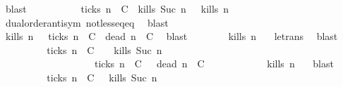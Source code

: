 \begin{isabellebody}
\ blast\isanewline
\ \ \ \ \ \ \isamarkupfalse%
\ \isamarkupfalse%
\ {\isacartoucheopen}{\isacharparenleft}{\isacharparenleft}{\isasymnot}\ {\isacharquery}ticks\ n\ {\isasymrho}\ C\ {\isasymand}\ {\isacharparenleft}{\isacharquery}kills\ {\isacharparenleft}Suc\ n{\isacharparenright}\ {\isasymrho}{\isacharparenright}{\isacharparenright}\ {\isasymlongrightarrow}\ {\isacharquery}kills\ n\ {\isasymrho}{\isacartoucheclose}\isanewline
\ \ \ \ \ \ \ \ \isamarkupfalse%
\ dual{\isacharunderscore}order{\isachardot}antisym\ not{\isacharunderscore}less{\isacharunderscore}eq{\isacharunderscore}eq\ \isamarkupfalse%
\ blast\isanewline
\ \ \ \ \ \ \isamarkupfalse%
\ \isamarkupfalse%
\ {\isacartoucheopen}{\isacharquery}kills\ n\ {\isasymrho}\ {\isasymor}\ {\isacharquery}ticks\ n\ {\isasymrho}\ C\ {\isasymand}\ {\isacharquery}dead\ n\ {\isasymrho}\ C\ \isamarkupfalse%
\ blast\isanewline
\ \ \ \ \ \ \isamarkupfalse%
\ {\isacartoucheopen}{\isacharquery}kills\ n\ {\isasymrho}{\isacartoucheclose}\ \isamarkupfalse%
\ le{\isacharunderscore}trans\ \isamarkupfalse%
\ blast\isanewline
\ \ \ \ \isacommand{{\isacharbraceright}}\isamarkupfalse%
\ \isamarkupfalse%
\ {\isacartoucheopen}{\isacharparenleft}{\isacharbraceleft}{\isasymrho}{\isachardot}\ {\isasymnot}\ {\isacharquery}ticks\ n\ {\isasymrho}\ C\ \ {\isasyminter}\ {\isacharbraceleft}{\isasymrho}{\isachardot}\ {\isacharquery}kills\ {\isacharparenleft}Suc\ n{\isacharparenright}\ {\isasymrho}{\isacharbraceright}{\isacharparenright}\isanewline
\ \ \ \ \ \ \ \ \ \ \ \ \ \ \ \ \ {\isasymunion}\ {\isacharparenleft}{\isacharbraceleft}{\isasymrho}{\isachardot}\ {\isacharquery}ticks\ n\ {\isasymrho}\ C\ {\isasyminter}\ {\isacharbraceleft}{\isasymrho}{\isachardot}\ {\isacharquery}dead\ n\ {\isasymrho}\ C\isanewline
\ \ \ \ \ \ \ \ \ \ {\isasymsubseteq}\ {\isacharbraceleft}{\isasymrho}{\isachardot}\ {\isacharquery}kills\ n\ {\isasymrho}{\isacharbraceright}{\isacartoucheclose}\ \isamarkupfalse%
\ blast\isanewline
\ \ \isamarkupfalse%
\isanewline
\ \ \isamarkupfalse%
\ \isamarkupfalse%
\ {\isacartoucheopen}{\isachardot}{\isachardot}{\isachardot}\ {\isacharequal}\ {\isacharbraceleft}{\isasymrho}{\isachardot}\ {\isasymnot}\ {\isacharquery}ticks\ n\ {\isasymrho}\ C\ {\isasyminter}\ {\isacharbraceleft}{\isasymrho}{\isachardot}\ {\isacharquery}kills\ {\isacharparenleft}Suc\ n{\isacharparenright}\ {\isasymrho}{\isacharbraceright}\isanewline

\end{isabellebody}
